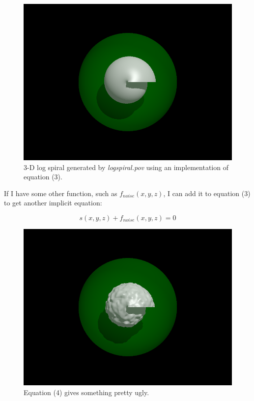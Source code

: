 \documentclass[a4paper]{article}
\begin{document}
\begin{figure}[h]
	\centering\includegraphics[scale=0.3]{./img/logspiral.png}
	\caption{3-D log spiral generated by \textit{logspiral.pov} using an implementation of equation (3).}
	\label{fig:3d-log-spiral} %
\end{figure}

If I have some other function, such as $f_{noise}(x,y,z)$, I can add it to equation (3) to get another implicit equation:

\begin{equation}
	s(x,y,z) + f_{noise}(x,y,z) = 0
\end{equation}

\begin{figure}[h]
	\centering\includegraphics[scale=0.3]{./img/logspiral_noise.png}
	\caption{Equation (4) gives something pretty ugly.}
	\label{fig:3d-log-spiral-noise} %
\end{figure}
\end{document}
